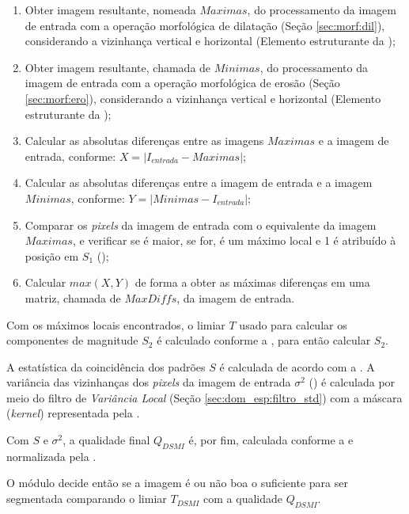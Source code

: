 \begin{enumerate}
    \item Obter imagem resultante, nomeada $Maximas$, do processamento da imagem de entrada com a operação morfológica de dilatação (Seção \ref{sec:morf:dil}), considerando a vizinhança vertical e horizontal (Elemento estruturante da );
    \item Obter imagem resultante, chamada de $Minimas$, do processamento da imagem de entrada com a operação morfológica de erosão (Seção \ref{sec:morf:ero}), considerando a vizinhança vertical e horizontal (Elemento estruturante da );
    \item Calcular as absolutas diferenças entre as imagens $Maximas$ e a imagem de entrada, conforme: $X = |I_{entrada} - Maximas|$;
    \item Calcular as absolutas diferenças entre a imagem de entrada e a imagem $Minimas$, conforme: $Y = |Minimas - I_{entrada}|$;
    \item Comparar os \textit{pixels} da imagem de entrada com o equivalente da imagem $Maximas$, e verificar se é maior, se for, é um máximo local e 1 é atribuído à posição em $S_{1}$ ();
    \item Calcular $max(X, Y)$ de forma a obter as máximas diferenças em uma matriz, chamada de $MaxDiffs$, da imagem de entrada.
\end{enumerate}

\par Com os máximos locais encontrados, o limiar $T$ usado para calcular os componentes de magnitude $S_{2}$ é calculado conforme a , para então calcular $S_{2}$. 

\par A estatística da coincidência dos padrões $S$ é calculada de acordo com a . A variância das vizinhanças dos \textit{pixels} da imagem de entrada $\sigma^2$ () é calculada por meio do filtro de \textit{Variância Local} (Seção \ref{sec:dom_esp:filtro_std}) com a máscara (\textit{kernel}) representada pela .

\par Com $S$ e $\sigma^2$, a qualidade final $Q_{DSMI}$ é, por fim, calculada conforme a  e normalizada pela .

\par O módulo decide então se a imagem é ou não boa o suficiente para ser segmentada comparando o limiar $T_{DSMI}$ com a qualidade $Q_{DSMI}$.

